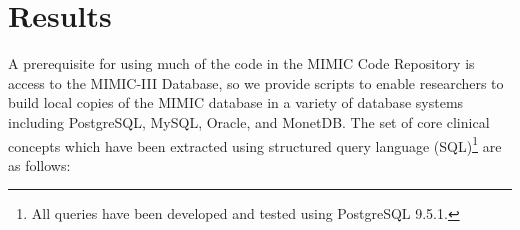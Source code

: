 \documentclass{elsart}
\begin{document}







\section{Results}


A prerequisite for using much of the code in the MIMIC Code Repository is access to the MIMIC-III Database, so we provide scripts to enable researchers to build local copies of the MIMIC database in a variety of database systems including PostgreSQL, MySQL, Oracle, and MonetDB.
The set of core clinical concepts which have been extracted using structured query language (SQL)\footnote{All queries have been developed and tested using PostgreSQL 9.5.1.} are as follows: 
\end{document}
